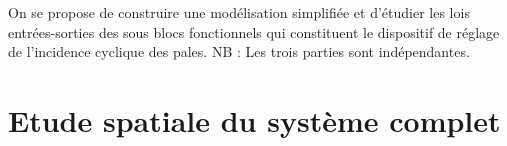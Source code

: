 On se propose de construire une modélisation simplifiée et d’étudier les lois entrées-sorties des sous blocs fonctionnels qui constituent le dispositif de réglage de l’incidence cyclique des pales.
NB : Les trois parties sont indépendantes. 
\fi

\section{Etude spatiale du système complet}


\ifprof
\else



